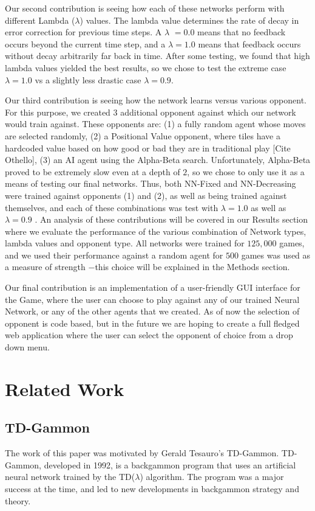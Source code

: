 \documentclass{sig-alternate-05-2015}
\begin{document}
Our second contribution is seeing how each of these networks perform with different Lambda (\(\lambda\)) values. The lambda value determines the rate of decay in error correction for previous time steps. A \(\lambda\) $= 0.0$ means that no feedback occurs beyond the current time step, and a $\lambda  = 1.0$ means that feedback occurs without decay arbitrarily far back in time. After some testing, we found that high lambda values yielded the best results, so we chose to test the extreme case $\lambda  = 1.0$ vs a slightly less drastic case $\lambda  = 0.9$.

Our third contribution is seeing how the network learns versus various opponent. For this purpose, we created 3 additional opponent against which our network would train against. These opponents are: (1) a fully random agent whose moves are selected randomly, (2) a Positional Value opponent, where tiles have a hardcoded value based on how good or bad they are in traditional play [Cite Othello], (3) an AI agent using the Alpha-Beta search. Unfortunately, Alpha-Beta proved to be extremely slow even at a depth of $2$, so we chose to only use it as a means of testing our final networks. Thus, both NN-Fixed and NN-Decreasing were trained against opponents (1) and (2), as well as being trained against themselves, and each of these combinations was test with $\lambda  = 1.0$ as well as $\lambda  = 0.9$ . An analysis of these contributions will be covered in our Results section where we evaluate the performance of the various combination of Network types, lambda values and opponent type. All networks were trained for $125,000$ games, and we used their performance against a random agent for $500$ games was used as a measure of strength $-$this choice will be explained in the Methods section.

Our final contribution is an implementation of a user-friendly GUI interface for the Game, where the user can choose to play against any of our trained Neural Network, or any of the other agents that we created. As of now the selection of opponent is code based, but in the future we are hoping to create a full fledged web application where the user can select the opponent of choice from a drop down menu. 



\section{Related Work}

\subsection{TD-Gammon}
The work of this paper was motivated by Gerald Tesauro's TD-Gammon. TD-Gammon, developed in 1992, is a backgammon program that uses an artificial neural network trained by the TD(\(\lambda\)) algorithm. The program was a major success at the time, and led to new developments in backgammon strategy and theory.
\end{document}
